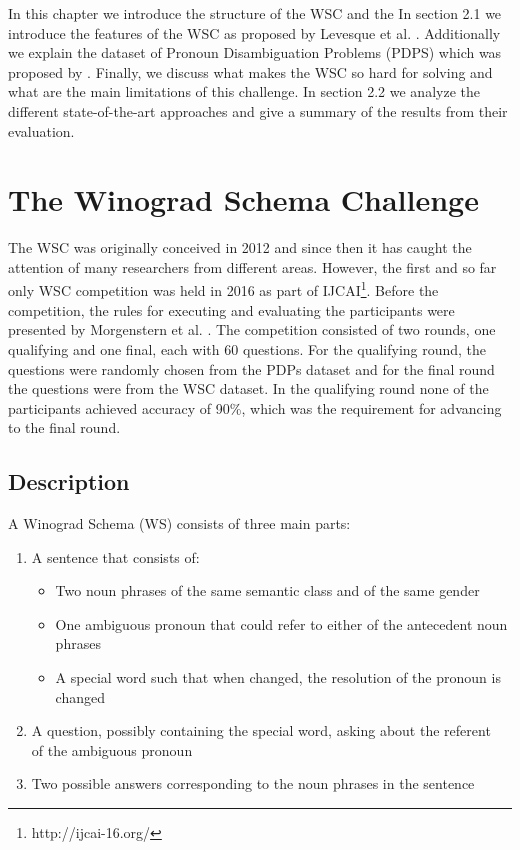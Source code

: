 \label{Background}
 In this chapter we introduce the structure of the WSC and the  
 In section 2.1 we introduce the features of the WSC as proposed by Levesque et al. \cite{DBLP:conf/kr/LevesqueDM12}. Additionally we explain the dataset of Pronoun Disambiguation Problems (PDPS) which was proposed by \cite{DBLP:conf/aaai/MorgensternO15}. Finally, we discuss what makes the WSC so hard for solving and what are the main limitations of this challenge. In section 2.2 we analyze the different state-of-the-art approaches and give a summary of the results from their evaluation.
 

\section{The Winograd Schema Challenge}
\label{section:TheWinogradSchemaChallenge}

The WSC was originally conceived in 2012 \cite{DBLP:conf/kr/LevesqueDM12} and since then it has caught the  attention of many researchers from different areas. However, the first and so far only WSC competition was held in 2016 as part of IJCAI\footnote{http://ijcai-16.org/}. Before the competition, the rules for executing and evaluating the participants were presented by Morgenstern et al. \cite{DBLP:journals/aim/MorgensternDO16}. The competition consisted of two rounds, one qualifying and one final, each with 60 questions. For the qualifying round, the questions were randomly chosen from the PDPs dataset and for the final round the questions were from the WSC dataset. In the qualifying round none of the participants achieved accuracy of 90\%, which was the requirement for advancing to the final round. 


\subsection{Description}
A Winograd Schema (WS) consists of three main parts:

\begin{enumerate}
	\item A sentence that consists of:
	\begin{itemize}
		\item Two noun phrases of the same semantic class and of the same gender
		\item One ambiguous pronoun that could refer to either of the antecedent noun phrases
		\item A special word such that when changed, the resolution of the pronoun is changed
	\end{itemize}
    \item A question, possibly containing the special word, asking about the referent \\of the ambiguous pronoun
    \item Two possible answers corresponding to the noun phrases in the sentence
\end{enumerate}

